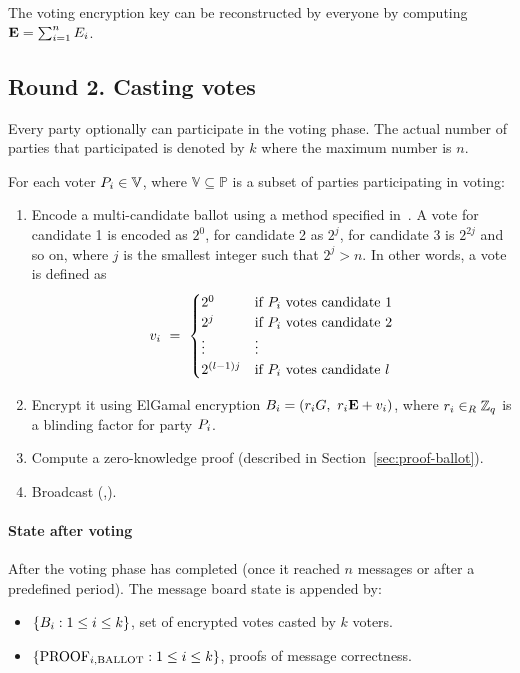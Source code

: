 \documentclass{article}
\begin{document}
The voting encryption key \EncryptionKey{} can be reconstructed by everyone by computing $\textbf{E}=\sum_{i=1}^{n} E_{i}$.


\subsection{Round 2. Casting votes}

Every party optionally can participate in the voting phase. The actual number of parties that participated is denoted by $k$ where the maximum number is $n$.

For each voter $P_{i} \in \mathbb{V}$, where $\mathbb{V} \subseteq  \mathbb{P}$ is a subset of parties participating in voting:


\begin{enumerate}
    \item Encode a multi-candidate ballot using a method specified in~\cite{baudronPracticalMulticandidateElection2001}. A vote for candidate 1 is encoded as $2^0$, for candidate 2 as $2^j$, for candidate 3 is $2^{2j}$ and so on, where $j$ is the smallest integer such that $2^j > n$. In other words, a vote is defined as \[v_{i}\ =\ \begin{cases} 2^0 & \text{if } P_i \text{ votes candidate 1} \\ 2^j & \text{if } P_i \text{ votes candidate 2} \\ \vdots & \vdots \\ 2^{(l-1)j} & \text{if } P_i \text{ votes candidate $l$}\end{cases}\]
    
    \item Encrypt it using ElGamal encryption $\Ballot{i} = (\BlindingFactor{i} G,\ \BlindingFactor{i} \EncryptionKey{} + \Vote{i})$, where $r_{i} \in_{R} \mathbb{Z}_q$ is a blinding factor for party $P_{i}$.
    
    \item Compute a zero-knowledge proof (described in Section~\ref{sec:proof-ballot}).
    \item Broadcast (,).
\end{enumerate}

\paragraph{State after voting}

After the voting phase has completed (once it reached $n$ messages or after a predefined period). The message board state is appended by:
\begin{itemize}
    \item $\{B_{i} : 1 \leq i \leq k\}$, set of encrypted votes casted by $k$ voters.
    \item $\{\textrm{PROOF}_{i,\textrm{BALLOT}} : 1 \leq i \leq k\}$, proofs of message correctness.
\end{itemize}
\end{document}
